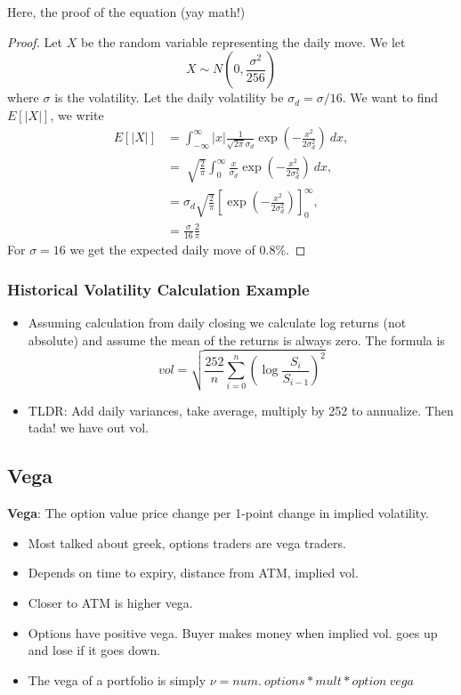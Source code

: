 \documentclass{article}
\begin{document}
Here, the proof of the equation (yay math!)
\begin{proof}
    Let $X$ be the random variable representing the daily move. We let 
    \begin{equation*}
        X \sim N\left(0, \frac{\sigma^2}{256}\right)
    \end{equation*}
    where $\sigma$ is the volatility. Let the daily volatility be
    $\sigma_d = \sigma / 16$. We want to find $E[|X|]$, we write
    \begin{align*}
        E[|X|] &= \int_{-\infty}^\infty |x| \frac{1}{\sqrt{2\pi}\sigma_d}\exp\left(-\frac{x^2}{2\sigma_d^2}\right) \ dx, \\
        &= \sqrt[]{\frac{2}{\pi}}\int_0^\infty \frac{x}{\sigma_d}\exp\left(-\frac{x^2}{2\sigma_d^2}\right) \ dx, \\
        &= \sigma_d\sqrt{\frac{2}{\pi}}\left[\exp\left(-\frac{x^2}{2\sigma_d^2}\right)\right]^\infty_0, \\
        &= \frac{\sigma}{16}\frac{2}{\pi}
    \end{align*}
    For $\sigma = 16$ we get the expected daily move of 0.8\%.
\end{proof}

\subsubsection{Historical Volatility Calculation Example}
\begin{itemize}
    \item Assuming calculation from daily closing we calculate log returns (not
    absolute) and assume the mean of the returns is always zero. The formula is 
    \begin{equation*}
        vol = \sqrt{\frac{252}{n}\sum_{i=0}^n\left(\log\frac{S_i}{S_{i-1}}\right)^2}
    \end{equation*}
    \item TLDR: Add daily variances, take average, multiply by 252 to annualize.
    Then tada! we have out vol.
\end{itemize}

\subsection*{Vega}
\textbf{Vega}: The option value price change per 1-point change in implied
volatility.
\begin{itemize}
    \item Most talked about greek, options traders are vega traders.
    \item Depends on time to expiry, distance from ATM, implied vol.
    \item Closer to ATM is higher vega.
    \item Options have positive vega. Buyer makes money when implied vol. goes
    up and lose if it goes down.
    \item The vega of a portfolio is simply $\nu = num. \ options * mult *
    option \ vega$
\end{itemize}
\end{document}
